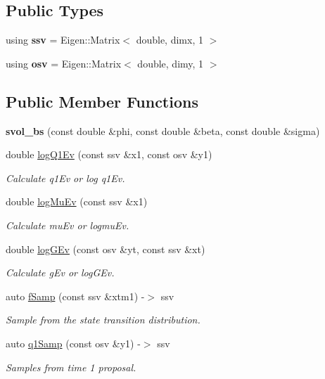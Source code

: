 \subsection*{Public Types}
\begin{DoxyCompactItemize}
\item 
using {\bfseries ssv} = Eigen\+::\+Matrix$<$ double, dimx, 1 $>$\hypertarget{classsvol__bs_a4901395fcf0f3c64f90d05c66339fe0e}{}\label{classsvol__bs_a4901395fcf0f3c64f90d05c66339fe0e}

\item 
using {\bfseries osv} = Eigen\+::\+Matrix$<$ double, dimy, 1 $>$\hypertarget{classsvol__bs_ada43d30435c238bad4e7affffc316db7}{}\label{classsvol__bs_ada43d30435c238bad4e7affffc316db7}

\end{DoxyCompactItemize}
\subsection*{Public Member Functions}
\begin{DoxyCompactItemize}
\item 
{\bfseries svol\+\_\+bs} (const double \&phi, const double \&beta, const double \&sigma)\hypertarget{classsvol__bs_a732fd48dc72387fa792c969bd4a7318d}{}\label{classsvol__bs_a732fd48dc72387fa792c969bd4a7318d}

\item 
double \hyperlink{classsvol__bs_aae36729af9543e86cfca34b6a4c901a1}{log\+Q1\+Ev} (const ssv \&x1, const osv \&y1)
\begin{DoxyCompactList}\small\item\em Calculate q1\+Ev or log q1\+Ev. \end{DoxyCompactList}\item 
double \hyperlink{classsvol__bs_a08e5fc3ae6560fe5d5ebf1498e972234}{log\+Mu\+Ev} (const ssv \&x1)
\begin{DoxyCompactList}\small\item\em Calculate mu\+Ev or logmu\+Ev. \end{DoxyCompactList}\item 
double \hyperlink{classsvol__bs_ab92198d54517c9dca2f0028440f140be}{log\+G\+Ev} (const osv \&yt, const ssv \&xt)
\begin{DoxyCompactList}\small\item\em Calculate g\+Ev or log\+G\+Ev. \end{DoxyCompactList}\item 
auto \hyperlink{classsvol__bs_a4546fb765228621313fc5ad8834e4cdf}{f\+Samp} (const ssv \&xtm1) -\/$>$ ssv
\begin{DoxyCompactList}\small\item\em Sample from the state transition distribution. \end{DoxyCompactList}\item 
auto \hyperlink{classsvol__bs_ac4e7a7ec8738284184be1649eaf084f1}{q1\+Samp} (const osv \&y1) -\/$>$ ssv
\begin{DoxyCompactList}\small\item\em Samples from time 1 proposal. \end{DoxyCompactList}\end{DoxyCompactItemize}
